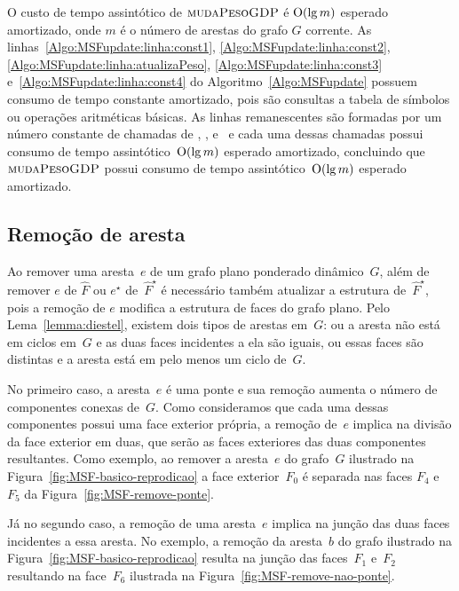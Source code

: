 O custo de tempo assintótico de $\text{\scshape mudaPesoGDP}$ é $\mathrm{O}(\lg m)$ esperado amortizado, onde $m$ é o número de arestas do grafo $G$ corrente.
As linhas~\ref{Algo:MSFupdate:linha:const1}, \ref{Algo:MSFupdate:linha:const2}, \ref{Algo:MSFupdate:linha:atualizaPeso}, \ref{Algo:MSFupdate:linha:const3} e~\ref{Algo:MSFupdate:linha:const4} do Algoritmo~\ref{Algo:MSFupdate} possuem consumo de tempo constante amortizado, pois são consultas a tabela de símbolos ou operações aritméticas básicas.
As linhas remanescentes são formadas por um número constante de chamadas de \LCOAddCost, \LCOFindNode, \LCOMerge{} e~\LCOSplit{} e cada uma dessas chamadas possui consumo de tempo assintótico~$\mathrm{O}(\lg m)$ esperado amortizado, concluindo que $\text{\scshape mudaPesoGDP}$ possui consumo de tempo assintótico~$\mathrm{O}(\lg m)$ esperado amortizado.

\subsection{Remoção de aresta}

Ao remover uma aresta~$e$ de um grafo plano ponderado dinâmico~$G$, além de remover $e$ de $\hat F$ ou $e^\star$ de~$\hat F^\star$ é necessário também atualizar a estrutura de~$\hat F^\star$, pois a remoção de $e$ modifica a estrutura de faces do grafo plano.
Pelo Lema~\ref{lemma:diestel}, existem dois tipos de arestas em~$G$: ou a aresta não está em ciclos em~$G$ e as duas faces incidentes a ela são iguais, ou essas faces são distintas e a aresta está em pelo menos um ciclo de~$G$.

No primeiro caso, a aresta~$e$ é uma ponte e sua remoção aumenta o número de componentes conexas de~$G$.
Como consideramos que cada uma dessas componentes possui uma face exterior própria, a remoção de~$e$ implica na divisão da face exterior em duas, que serão as faces exteriores das duas componentes resultantes.
Como exemplo, ao remover a aresta~$e$ do grafo~$G$ ilustrado na Figura~\ref{fig:MSF-basico-reprodicao} a face exterior~$F_0$ é separada nas faces $F_4$ e~$F_5$ da Figura~\ref{fig:MSF-remove-ponte}.


Já no segundo caso, a remoção de uma aresta~$e$ implica na junção das duas faces incidentes a essa aresta.
No exemplo, a remoção da aresta~$b$ do grafo ilustrado na Figura~\ref{fig:MSF-basico-reprodicao} resulta na junção das faces~$F_1$ e~$F_2$ resultando na face~$F_6$ ilustrada na Figura~\ref{fig:MSF-remove-nao-ponte}.

